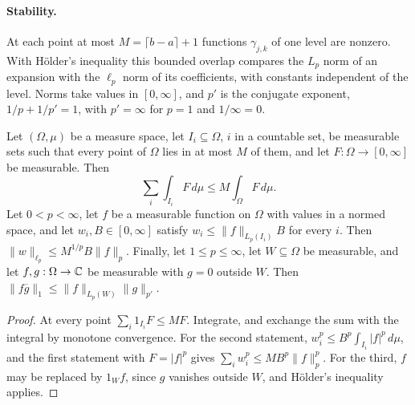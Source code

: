 \paragraph{Stability.}
At each point at most $M = \lceil b - a \rceil + 1$ functions $\gamma_{j,k}$ of one level are
nonzero. With H\"older's inequality this bounded overlap compares the $L_p$ norm of an expansion
with the $\ell_p$ norm of its coefficients, with constants independent of the level. Norms take
values in $[0, \infty]$, and $p'$ is the conjugate exponent, $1/p + 1/p' = 1$, with $p' = \infty$
for $p = 1$ and $1/\infty = 0$.

\begin{lemma}
\label{lem:daub-window-inequality}
\leanok
{}
Let $(\Omega, \mu)$ be a measure space, let $I_i \subseteq \Omega$, $i$ in a countable set, be
measurable sets such that every point of $\Omega$ lies in at most $M$ of them, and let
$F : \Omega \to [0, \infty]$ be measurable. Then
\[
  \sum_i \int_{I_i} F \, d\mu \leq M \int_\Omega F \, d\mu .
\]
Let $0 < p < \infty$, let $f$ be a measurable function on $\Omega$ with values in a normed space,
and let $w_i, B \in [0, \infty]$ satisfy $w_i \leq \|f\|_{L_p(I_i)} B$ for every $i$. Then
$\|w\|_{\ell_p} \leq M^{1/p} B \|f\|_p$. Finally, let $1 \leq p \leq \infty$, let
$W \subseteq \Omega$ be measurable, and let $f, g : \Omega \to \mathbb{C}$ be measurable with $g = 0$
outside $W$. Then $\|f \overline{g}\|_1 \leq \|f\|_{L_p(W)} \|g\|_{p'}$.
\end{lemma}

\begin{proof}
\leanok
At every point $\sum_i 1_{I_i} F \leq M F$. Integrate, and exchange the sum with the integral by
monotone convergence. For the second statement, $w_i^p \leq B^p \int_{I_i} |f|^p \, d\mu$, and the
first statement with $F = |f|^p$ gives $\sum_i w_i^p \leq M B^p \|f\|_p^p$. For the third, $f$
may be replaced by $1_W f$, since $g$ vanishes outside $W$, and H\"older's inequality applies.
\end{proof}

